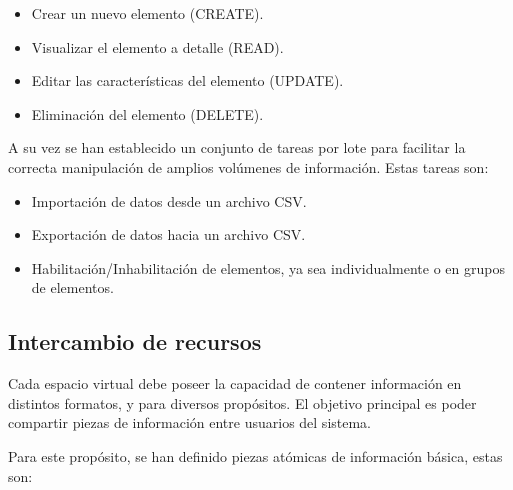 \begin{itemize}
\item Crear un nuevo elemento (CREATE).
\item Visualizar el elemento a detalle (READ).
\item Editar las características del elemento (UPDATE).
\item Eliminación del elemento (DELETE).
\end{itemize}

A su vez se han establecido un conjunto de tareas por lote para facilitar la
correcta manipulación de amplios volúmenes de información. Estas tareas son:

\begin{itemize}
\item Importación de datos desde un archivo CSV.
\item Exportación de datos hacia un archivo CSV.
\item Habilitación/Inhabilitación de elementos, ya sea individualmente o en
      grupos de elementos.
\end{itemize}

\subsection{Intercambio de recursos}

Cada espacio virtual debe poseer la capacidad de contener información en
distintos formatos, y para diversos propósitos. El objetivo principal es poder
compartir piezas de información entre usuarios del sistema.

Para este propósito, se han definido piezas atómicas de información básica,
estas son:

